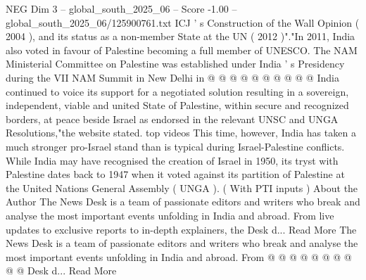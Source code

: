 \begin{textsample}{NEG Dim 3 – global\_south\_2025\_06 – Score -1.00 – global\_south\_2025\_06/125900761.txt}
ICJ ' s Construction of the Wall Opinion ( 2004 ), and its status as a non-member State at the UN ( 2012 )"."In 2011, India also voted in favour of Palestine becoming a full member of UNESCO.
The NAM Ministerial Committee on Palestine was established under India ' s Presidency during the VII NAM Summit in New Delhi in @ @ @ @ @ @ @ @ @ @ India continued to voice its support for a negotiated solution resulting in a sovereign, independent, viable and united State of Palestine, within secure and recognized borders, at peace beside Israel as endorsed in the relevant UNSC and UNGA Resolutions,"the website stated. top videos This time, however, India has taken a much stronger pro-Israel stand than is typical during Israel-Palestine conflicts.
While India may have recognised the creation of Israel in 1950, its tryst with Palestine dates back to 1947 when it voted against its partition of Palestine at the United Nations General Assembly ( UNGA ). ( With PTI inputs ) About the Author The News Desk is a team of passionate editors and writers who break and analyse the most important events unfolding in India and abroad.
From live updates to exclusive reports to in-depth explainers, the Desk d...
Read More The News Desk is a team of passionate editors and writers who break and analyse the most important events unfolding in India and abroad.
From @ @ @ @ @ @ @ @ @ @ Desk d...
Read More

\end{textsample}
